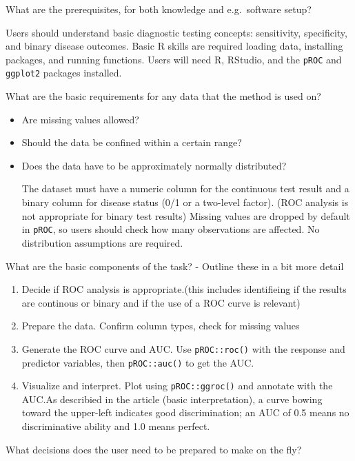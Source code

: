 \documentclass[
  letterpaper,
  DIV=11,
  numbers=noendperiod]{scrreprt}
\providecommand{\tightlist}{%
  \setlength{\itemsep}{0pt}\setlength{\parskip}{0pt}}\usepackage{longtable,booktabs,array}
\begin{document}
What are the prerequisites, for both knowledge and e.g.~software setup?

Users should understand basic diagnostic testing concepts: sensitivity,
specificity, and binary disease outcomes. Basic R skills are required
loading data, installing packages, and running functions. Users will
need R, RStudio, and the \texttt{pROC} and \texttt{ggplot2} packages
installed.

What are the basic requirements for any data that the method is used on?

\begin{itemize}
\item
  Are missing values allowed?
\item
  Should the data be confined within a certain range?
\item
  Does the data have to be approximately normally distributed?

  The dataset must have a numeric column for the continuous test result
  and a binary column for disease status (0/1 or a two-level factor).
  (ROC analysis is not appropriate for binary test results) Missing
  values are dropped by default in \texttt{pROC}, so users should check
  how many observations are affected. No distribution assumptions are
  required.
\end{itemize}

What are the basic components of the task? - Outline these in a bit more
detail

\begin{enumerate}
\def\labelenumi{\arabic{enumi}.}
\tightlist
\item
  Decide if ROC analysis is appropriate.(this includes identifieing if
  the results are continous or binary and if the use of a ROC curve is
  relevant)
\item
  Prepare the data. Confirm column types, check for missing values
\item
  Generate the ROC curve and AUC. Use \texttt{pROC::roc()} with the
  response and predictor variables, then \texttt{pROC::auc()} to get the
  AUC.
\item
  Visualize and interpret. Plot using \texttt{pROC::ggroc()} and
  annotate with the AUC.As describied in the article (basic
  interpretation), a curve bowing toward the upper-left indicates good
  discrimination; an AUC of 0.5 means no discriminative ability and 1.0
  means perfect.
\end{enumerate}

What decisions does the user need to be prepared to make on the fly?
\end{document}
